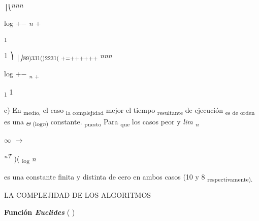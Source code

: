 \documentclass[12pt]{article}
\renewcommand{\_}{\kern-1.5pt\textunderscore\kern-1.5pt}
\begin{document}
\textsubscript{│⎝}\textit{nnn }\par

\begin{Center}
log +$-$  \textit{n }+ 
\end{Center}\par

\textsubscript{1 }\par

1 ⎞ \textsubscript{│⎠89)331()2231( +=++++++ }\textit{nnn }\par

\begin{Center}
log +$-$  \textit{\textsubscript{n }}\textsubscript{+ }
\end{Center}\par

\begin{FlushRight}
\textsubscript{1 }1 {\fontsize{10pt}{12.0pt}\selectfont c) En \textsubscript{medio, }el caso \textsubscript{la complejidad }mejor el tiempo \textsubscript{resultante }de ejecución \textsubscript{es de orden }es una \textsubscript{$ \Theta $ (log\textit{n}) }constante. \textsubscript{puesto }Para \textsubscript{que }los casos peor y \textit{lim \textsubscript{n }}{\fontsize{6pt}{7.2pt}\selectfont $\infty$ $ \rightarrow $  \par}\par}
\end{FlushRight}\par

\begin{Center}
\textit{\textsuperscript{nT }})( \textsubscript{log }\textit{n}{\fontsize{10pt}{12.0pt}\selectfont es una constante finita y distinta de cero en ambos casos (10 y 8 \textsubscript{respectivamente). }\par}
\end{Center}\par

\begin{adjustwidth}{0.58in}{0.57in}
{\fontsize{7pt}{8.4pt}\selectfont LA COMPLEJIDAD DE LOS ALGORITMOS {\fontsize{10pt}{12.0pt} \par}\par}\par

\end{adjustwidth}

\begin{adjustwidth}{0.58in}{0.57in}
{\fontsize{10pt}{12.0pt}\selectfont \textbf{Función \textit{Euclides }}( ) \par}\par

\end{adjustwidth}
\end{document}
